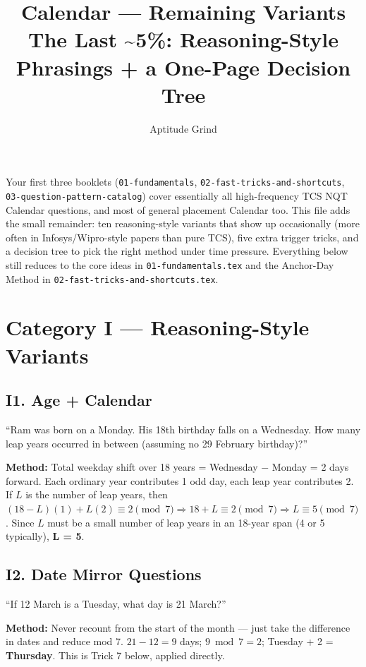 \documentclass[11pt]{article}
\title{\color{primary}\textbf{Calendar --- Remaining Variants}\\[4pt]\large The Last \~{}5\%: Reasoning-Style Phrasings + a One-Page Decision Tree}
\author{Aptitude Grind}
\date{}
\begin{document}
\maketitle
\thispagestyle{fancy}

\noindent Your first three booklets (\texttt{01-fundamentals}, \texttt{02-fast-tricks-and-shortcuts},
\texttt{03-question-pattern-catalog}) cover essentially all high-frequency TCS NQT Calendar
questions, and most of general placement Calendar too. This file adds the small remainder: ten
reasoning-style variants that show up occasionally (more often in Infosys/Wipro-style papers than
pure TCS), five extra trigger tricks, and a decision tree to pick the right method under time
pressure. Everything below still reduces to the core ideas in \texttt{01-fundamentals.tex} and the
Anchor-Day Method in \texttt{02-fast-tricks-and-shortcuts.tex}.

\section*{Category I --- Reasoning-Style Variants}

\subsection*{I1. Age + Calendar}
\begin{tipbox}[Phrasing]
``Ram was born on a Monday. His 18th birthday falls on a Wednesday. How many leap years occurred in
between (assuming no 29 February birthday)?''
\end{tipbox}
\textbf{Method:} Total weekday shift over 18 years = Wednesday $-$ Monday = 2 days forward. Each
ordinary year contributes 1 odd day, each leap year contributes 2. If $L$ is the number of leap
years, then $(18-L)(1)+L(2)\equiv2\pmod7 \Rightarrow 18+L\equiv2\pmod7 \Rightarrow L\equiv5\pmod7$.
Since $L$ must be a small number of leap years in an 18-year span (4 or 5 typically), \textbf{L = 5}.

\subsection*{I2. Date Mirror Questions}
\begin{tipbox}[Phrasing]
``If 12 March is a Tuesday, what day is 21 March?''
\end{tipbox}
\textbf{Method:} Never recount from the start of the month --- just take the difference in dates and
reduce mod 7. $21-12=9$ days; $9 \bmod 7=2$; Tuesday + 2 = \textbf{Thursday}. This is Trick 7 below,
applied directly.
\end{document}
